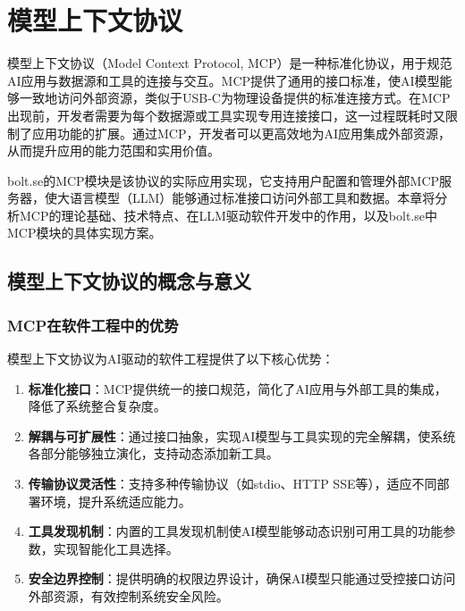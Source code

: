 
\chapter{模型上下文协议}

模型上下文协议（Model Context Protocol, MCP）是一种标准化协议，用于规范AI应用与数据源和工具的连接与交互。MCP提供了通用的接口标准，使AI模型能够一致地访问外部资源，类似于USB-C为物理设备提供的标准连接方式。在MCP出现前，开发者需要为每个数据源或工具实现专用连接接口，这一过程既耗时又限制了应用功能的扩展。通过MCP，开发者可以更高效地为AI应用集成外部资源，从而提升应用的能力范围和实用价值\cite{mcpspec2023}。

bolt.se的MCP模块是该协议的实际应用实现，它支持用户配置和管理外部MCP服务器，使大语言模型（LLM）能够通过标准接口访问外部工具和数据。本章将分析MCP的理论基础、技术特点、在LLM驱动软件开发中的作用，以及bolt.se中MCP模块的具体实现方案。

\section{模型上下文协议的概念与意义}

\subsection{MCP在软件工程中的优势}
模型上下文协议为AI驱动的软件工程提供了以下核心优势：

\begin{enumerate}
  \item \textbf{标准化接口}：MCP提供统一的接口规范，简化了AI应用与外部工具的集成，降低了系统整合复杂度。
  
  \item \textbf{解耦与可扩展性}：通过接口抽象，实现AI模型与工具实现的完全解耦，使系统各部分能够独立演化，支持动态添加新工具。
  
  \item \textbf{传输协议灵活性}：支持多种传输协议（如stdio、HTTP SSE等），适应不同部署环境，提升系统适应能力。
  
  \item \textbf{工具发现机制}：内置的工具发现机制使AI模型能够动态识别可用工具的功能参数，实现智能化工具选择。
  
  \item \textbf{安全边界控制}：提供明确的权限边界设计，确保AI模型只能通过受控接口访问外部资源，有效控制系统安全风险。
\end{enumerate}

